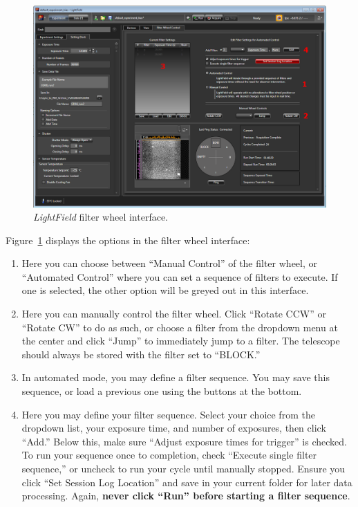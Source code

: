 \documentclass[12pt]{article}
\begin{document}
\begin{figure}[b!]
   \centering
   \includegraphics[width=\textwidth]{LightField_filter.PNG}
   \caption{\textit{LightField} filter wheel interface.\label{fig:filters}}
\end{figure}

\noindent Figure~\ref{fig:filters} displays the options in the filter wheel interface:
\begin{enumerate}
   \item Here you can choose between ``Manual Control'' of the filter wheel, or ``Automated Control'' where you can set a sequence of filters to execute. If one is selected, the other option will be greyed out in this interface.
   \item Here you can manually control the filter wheel. Click ``Rotate CCW'' or ``Rotate CW'' to do as such, or choose a filter from the dropdown menu at the center and click ``Jump'' to immediately jump to a filter. The telescope should always be stored with the filter set to ``BLOCK.''
   \item In automated mode, you may define a filter sequence. You may save this sequence, or load a previous one using the buttons at the bottom.
   \item Here you may define your filter sequence. Select your choice from the dropdown list, your exposure time, and number of exposures, then click ``Add.'' Below this, make sure ``Adjust exposure times for trigger'' is checked. To run your sequence once to completion, check ``Execute single filter sequence,'' or uncheck to run your cycle until manually stopped. Ensure you click ``Set Session Log Location'' and save in your current folder for later data processing. Again, \textbf{never click ``Run'' before starting a filter sequence}.
\end{enumerate}
\end{document}
